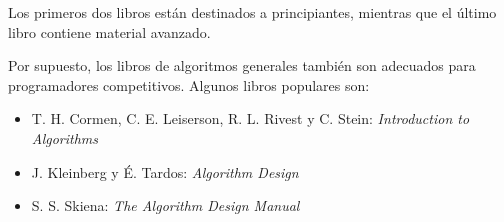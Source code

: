 Los primeros dos libros están destinados a principiantes,
mientras que el último libro contiene material avanzado.

Por supuesto, los libros de algoritmos generales también son adecuados para
programadores competitivos.
Algunos libros populares son:

\begin{itemize}
\item T. H. Cormen, C. E. Leiserson, R. L. Rivest y C. Stein:
\emph{Introduction to Algorithms} \cite{cor09}
\item J. Kleinberg y É. Tardos:
\emph{Algorithm Design} \cite{kle05}
\item S. S. Skiena:
\emph{The Algorithm Design Manual} \cite{ski08}
\end{itemize}

